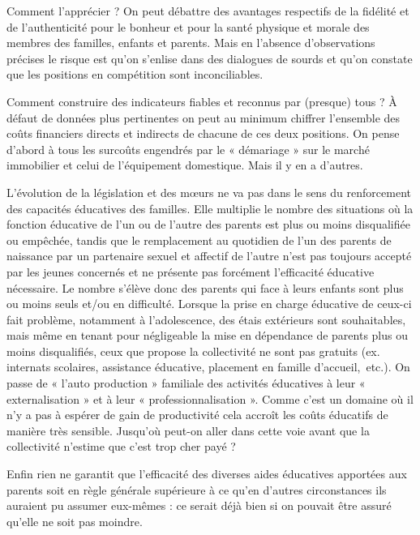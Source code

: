 Comment l'apprécier ? On peut débattre des avantages respectifs de la fidélité et de l'authenticité pour le bonheur et pour la santé physique et morale des membres des familles, enfants et parents. Mais en l'absence d'observations précises le risque est qu'on s'enlise dans des dialogues de sourds et qu'on constate que les positions en compétition sont inconciliables. 

Comment construire des indicateurs fiables et reconnus par (presque) tous ? À défaut de données plus pertinentes on peut au minimum chiffrer l'ensemble des coûts financiers directs et indirects de chacune de ces deux positions. On pense d'abord à tous les surcoûts engendrés par le « démariage » sur le marché immobilier et celui de l'équipement domestique. Mais il y en a d'autres.


L'évolution de la législation et des mœurs ne va pas dans le sens du renforcement des capacités éducatives des familles. Elle multiplie le nombre des situations où la fonction éducative de l'un ou de l'autre des parents est plus ou moins disqualifiée ou empêchée, tandis que le remplacement au quotidien de l'un des parents de naissance par un partenaire sexuel et affectif de l'autre n'est pas toujours accepté par les jeunes concernés et ne présente pas forcément l'efficacité éducative nécessaire. Le nombre s'élève donc des parents qui face à leurs enfants sont plus ou moins seuls et/ou en difficulté. Lorsque la prise en charge éducative de ceux-ci fait problème, notamment à l'adolescence, des étais extérieurs sont souhaitables, mais même en tenant pour négligeable la mise en dépendance de parents plus ou moins disqualifiés, ceux que propose la collectivité ne sont pas gratuits (ex. internats scolaires, assistance éducative, placement en famille d'accueil,~etc.). On passe de « l'auto production » familiale des activités éducatives à leur « externalisation » et à leur « professionnalisation ». Comme c'est un domaine où il n'y a pas à espérer de gain de productivité cela accroît les coûts éducatifs de manière très sensible. Jusqu'où peut-on aller dans cette voie avant que la collectivité n'estime que c'est trop cher payé ? 

Enfin rien ne garantit que l'efficacité des diverses aides éducatives apportées aux parents soit en règle générale supérieure à ce qu'en d'autres circonstances ils auraient pu assumer eux-mêmes : ce serait déjà bien si on pouvait être assuré qu'elle ne soit pas moindre. 

 
 
